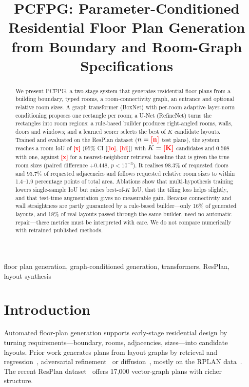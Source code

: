 \documentclass[conference]{IEEEtran}
\newcommand{\todo}[1]{\textcolor{red}{\textbf{[#1]}}}
\newcommand{\resRoomIoU}{\todo{x}}\newcommand{\resRoomIoULo}{\todo{lo}}\newcommand{\resRoomIoUHi}{\todo{hi}}\newcommand{\resN}{\todo{n}}\newcommand{\resBaseIoU}{\todo{x}}\newcommand{\resK}{\todo{K}}
\begin{document}
\title{PCFPG: Parameter-Conditioned Residential Floor Plan Generation from Boundary and Room-Graph Specifications}
\author{\IEEEauthorblockN{\todo{Author name(s)}}
\IEEEauthorblockA{\todo{Department, Institution, City, Country}\\ \todo{email}}}
\maketitle

\begin{abstract}
We present PCFPG, a two-stage system that generates residential floor plans from a building boundary, typed rooms, a room-connectivity graph, an entrance and optional relative room sizes. A graph transformer (BoxNet) with per-room adaptive layer-norm conditioning proposes one rectangle per room; a U-Net (RefineNet) turns the rectangles into room regions; a rule-based builder produces right-angled rooms, walls, doors and windows; and a learned scorer selects the best of $K$ candidate layouts. Trained and evaluated on the ResPlan dataset ($n=\resN$ test plans), the system reaches a room IoU of \resRoomIoU{} (95\% CI [\resRoomIoULo, \resRoomIoUHi]) with $K=\resK$ candidates and 0.598 with one, against \resBaseIoU{} for a nearest-neighbour retrieval baseline that is given the true room sizes (paired difference $+0.448$, $p<10^{-3}$). It realises 98.3\% of requested doors and 93.7\% of requested adjacencies and follows requested relative room sizes to within 1.4--1.9 percentage points of total area. Ablations show that multi-hypothesis training lowers single-sample IoU but raises best-of-$K$ IoU, that the tiling loss helps slightly, and that test-time augmentation gives no measurable gain. Because connectivity and wall straightness are partly guaranteed by a rule-based builder---only 16\% of generated layouts, and 18\% of real layouts passed through the same builder, need no automatic repair---these metrics must be interpreted with care. We do not compare numerically with retrained published methods.
\end{abstract}

\begin{IEEEkeywords}
floor plan generation, graph-conditioned generation, transformers, ResPlan, layout synthesis
\end{IEEEkeywords}

\section{Introduction}
Automated floor-plan generation supports early-stage residential design by turning requirements---boundary, rooms, adjacencies, sizes---into candidate layouts. Prior work generates plans from layout graphs by retrieval and regression~\cite{hu2020graph2plan}, adversarial refinement~\cite{nauata2020housegan,nauata2021housegan++} or diffusion~\cite{shabani2023housediffusion}, mostly on the RPLAN data~\cite{wu2019rplan}. The recent ResPlan dataset~\cite{abouagour2025resplan} offers 17{,}000 vector-graph plans with richer structure.
\end{document}
